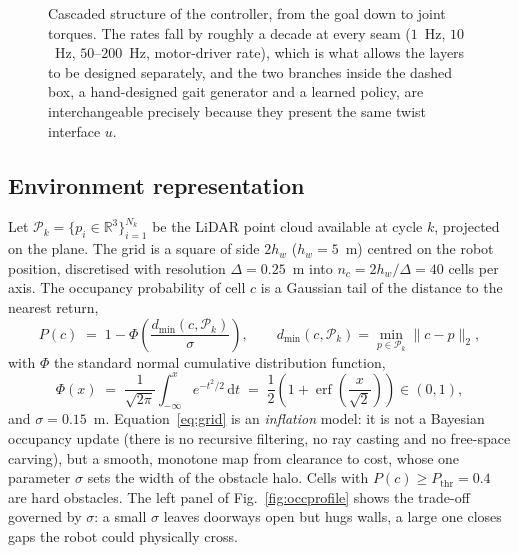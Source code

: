 \documentclass[11pt,a4paper]{article}
\newcommand{\R}{\mathbb{R}}
\begin{document}
\begin{figure}[htbp]
  \caption{Cascaded structure of the controller, from the goal down to joint torques. The
  rates fall by roughly a decade at every seam ($1$~Hz, $10$~Hz, $50$--$200$~Hz, motor-driver rate), which is
  what allows the layers to be designed separately, and the two branches inside the dashed box, a
  hand-designed gait generator and a learned policy, are interchangeable precisely because they present the
  same twist interface $u$.}
  \label{fig:cascade}
\end{figure}

\subsection{Environment representation}
\label{sec:grid}

Let $\mathcal{P}_k=\{p_i\in\R^3\}_{i=1}^{N_k}$ be the LiDAR point cloud available at cycle $k$, projected on
the plane. The grid is a square of side $2h_w$ ($h_w=5$~m) centred on the robot position, discretised with
resolution $\Delta=0.25$~m into $n_c=2h_w/\Delta=40$ cells per axis. The occupancy probability of cell $c$ is
a Gaussian tail of the distance to the nearest return,
\begin{equation}
  P(c) \;=\; 1-\Phi\!\left(\frac{d_{\min}(c,\mathcal{P}_k)}{\sigma}\right),
  \qquad d_{\min}(c,\mathcal{P}_k)=\min_{p\in\mathcal{P}_k}\|c-p\|_2 ,
  \label{eq:grid}
\end{equation}
with $\Phi$ the standard normal cumulative distribution function,
\begin{equation}
  \Phi(x) \;=\; \frac{1}{\sqrt{2\pi}}\int_{-\infty}^{x}e^{-t^2/2}\,\mathrm{d}t
  \;=\; \frac{1}{2}\left(1+\operatorname{erf}\!\left(\frac{x}{\sqrt{2}}\right)\right)\in(0,1),
  \label{eq:phi}
\end{equation}
and $\sigma=0.15$~m. Equation~\eqref{eq:grid} is an \emph{inflation}
model: it is not a Bayesian occupancy update (there is no recursive filtering, no ray casting and no free-space
carving), but a smooth, monotone map from clearance to cost, whose one parameter $\sigma$ sets the width of
the obstacle halo. Cells with $P(c)\ge P_{\mathrm{thr}}=0.4$ are hard obstacles. The left panel of
Fig.~\ref{fig:occprofile} shows the trade-off governed by $\sigma$: a small $\sigma$ leaves doorways open but
hugs walls, a large one closes gaps the robot could physically cross.
\end{document}
